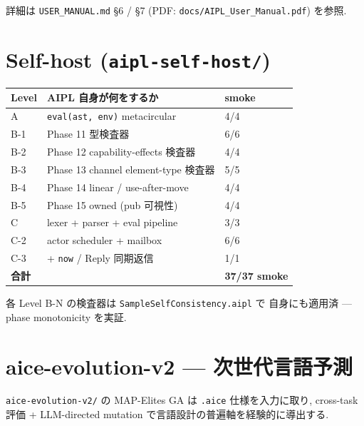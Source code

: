 \documentclass[11pt,a4paper]{article}
\begin{document}
詳細は \texttt{USER\_MANUAL.md} §6 / §7 (PDF: \texttt{docs/AIPL\_User\_Manual.pdf}) を参照.

\section{Self-host (\texttt{aipl-self-host/})}

\begin{center}
\begin{tabular}{lll}
\toprule
Level & AIPL 自身が何をするか & smoke \\
\midrule
A & \texttt{eval(ast, env)} metacircular & 4/4 \\
B-1 & Phase 11 型検査器 & 6/6 \\
B-2 & Phase 12 capability-effects 検査器 & 4/4 \\
B-3 & Phase 13 channel element-type 検査器 & 5/5 \\
B-4 & Phase 14 linear / use-after-move & 4/4 \\
B-5 & Phase 15 owned (pub 可視性) & 4/4 \\
C & lexer + parser + eval pipeline & 3/3 \\
C-2 & actor scheduler + mailbox & 6/6 \\
C-3 & + \texttt{now} / Reply 同期返信 & 1/1 \\
\midrule
\multicolumn{2}{l}{\textbf{合計}} & \textbf{37/37 smoke} \\
\bottomrule
\end{tabular}
\end{center}

各 Level B-N の検査器は \texttt{SampleSelfConsistency.aipl} で
自身にも適用済 — phase monotonicity を実証.

\section{aice-evolution-v2 --- 次世代言語予測}

\texttt{aice-evolution-v2/} の MAP-Elites GA は \texttt{.aice} 仕様を入力に取り,
cross-task 評価 + LLM-directed mutation で言語設計の普遍軸を経験的に導出する.
\end{document}

